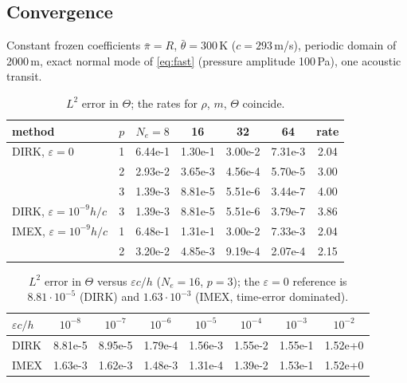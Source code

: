 \documentclass[11pt,a4paper]{article}
\newcommand{\thb}{\bar\theta}
\newcommand{\pib}{\bar\pi}
\begin{document}
\subsection{Convergence}
Constant frozen coefficients $\pib=R$, $\thb=300$\,K ($c=293$\,m/s), periodic domain of 2000\,m,
exact normal mode of \eqref{eq:fast} (pressure amplitude 100\,Pa), one acoustic transit.
\begin{table}[h]\centering
\caption{$L^2$ error in $\Theta$; the rates for $\rho$, $m$, $\Theta$ coincide.}\label{tab:conv}
\begin{tabular}{llccccc}\toprule
method & $p$ & $N_e=8$ & 16 & 32 & 64 & rate\\\midrule
DIRK, $\varepsilon=0$ & 1 & 6.44e-1 & 1.30e-1 & 3.00e-2 & 7.31e-3 & 2.04\\
 & 2 & 2.93e-2 & 3.65e-3 & 4.56e-4 & 5.70e-5 & 3.00\\
 & 3 & 1.39e-3 & 8.81e-5 & 5.51e-6 & 3.44e-7 & 4.00\\
DIRK, $\varepsilon=10^{-9}h/c$ & 3 & 1.39e-3 & 8.81e-5 & 5.51e-6 & 3.79e-7 & 3.86\\
IMEX, $\varepsilon=10^{-9}h/c$ & 1 & 6.48e-1 & 1.31e-1 & 3.00e-2 & 7.33e-3 & 2.04\\
 & 2 & 3.20e-2 & 4.85e-3 & 9.19e-4 & 2.07e-4 & 2.15\\\bottomrule
\end{tabular}
\end{table}

\begin{table}[h]\centering
\caption{$L^2$ error in $\Theta$ versus $\varepsilon c/h$ ($N_e=16$, $p=3$); the $\varepsilon=0$
reference is $8.81\cdot10^{-5}$ (DIRK) and $1.63\cdot10^{-3}$ (IMEX, time-error dominated).}\label{tab:eps}
\begin{tabular}{lccccccc}\toprule
$\varepsilon c/h$ & $10^{-8}$ & $10^{-7}$ & $10^{-6}$ & $10^{-5}$ & $10^{-4}$ & $10^{-3}$ & $10^{-2}$\\\midrule
DIRK & 8.81e-5 & 8.95e-5 & 1.79e-4 & 1.56e-3 & 1.55e-2 & 1.55e-1 & 1.52e+0\\
IMEX & 1.63e-3 & 1.62e-3 & 1.48e-3 & 1.31e-4 & 1.39e-2 & 1.53e-1 & 1.52e+0\\\bottomrule
\end{tabular}
\end{table}
\end{document}
